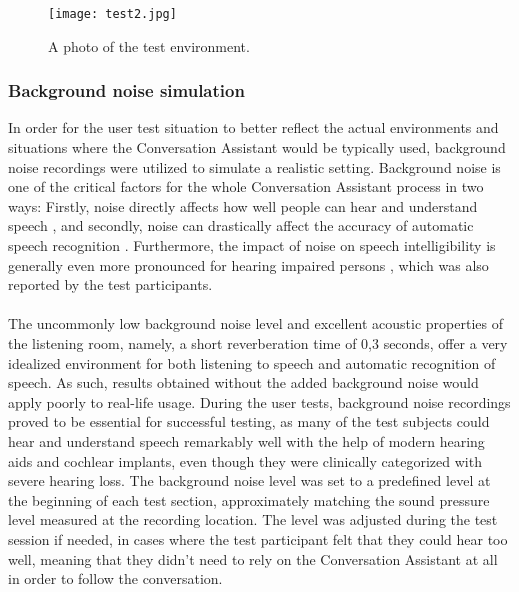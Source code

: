 \documentclass[english, 12pt, a4paper, pdftex, elec, utf8]{aaltothesis}
\begin{document}
\begin{figure}[h]
    \centering
    \texttt{[image: test2.jpg]}
    \caption{A photo of the test environment.}
    \label{fig:photo}
\end{figure}

\subsubsection{Background noise simulation}

In order for the user test situation to better reflect the actual environments and situations where the Conversation Assistant would be typically used, background noise recordings were utilized to simulate a realistic setting. Background noise is one of the critical factors for the whole Conversation Assistant process in two ways: Firstly, noise directly affects how well people can hear and understand speech \cite{pulkki2015communication}, and secondly, noise can drastically affect the accuracy of automatic speech recognition \cite{kallasjoki2016}. Furthermore, the impact of noise on speech intelligibility is generally even more pronounced for hearing impaired persons \cite{healy2016difficulty}, which was also reported by the test participants. \\\\
The uncommonly low background noise level and excellent acoustic properties of the listening room, namely, a short reverberation time of 0,3 seconds, offer a very idealized environment for both listening to speech and automatic recognition of speech. As such, results obtained without the added background noise would apply poorly to real-life usage. During the user tests, background noise recordings proved to be essential for successful testing, as many of the test subjects could hear and understand speech remarkably well with the help of modern hearing aids and cochlear implants, even though they were clinically categorized with severe hearing loss. The background noise level was set to a predefined level at the beginning of each test section, approximately matching the sound pressure level measured at the recording location. The level was adjusted during the test session if needed, in cases where the test participant felt that they could hear too well, meaning that they didn't need to rely on the Conversation Assistant at all in order to follow the conversation. \\\\
\end{document}
